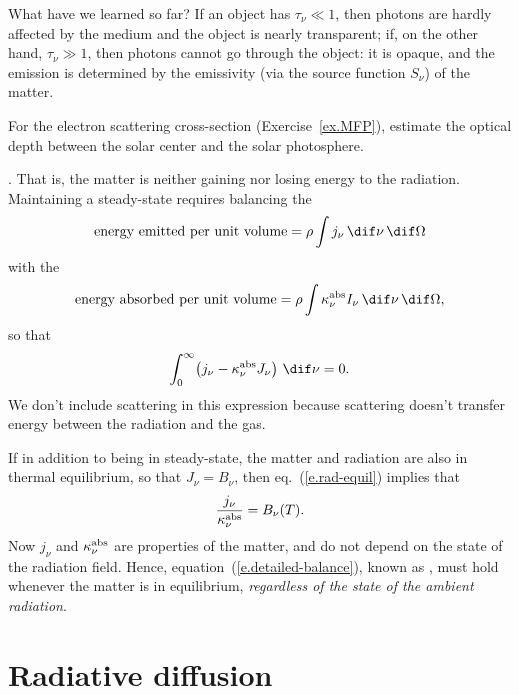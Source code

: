 What have we learned so far? If an object has $\tau_{\nu}\ll 1$, then photons are hardly affected by the medium and the object is nearly transparent; if, on the other hand, $\tau_{\nu} \gg 1$, then photons cannot go through the object: it is opaque, and the emission is determined by the emissivity (via the source function $S_{\nu}$) of the matter.

\begin{exercisebox}
For the electron scattering cross-section (Exercise~\ref{ex.MFP}), estimate the optical depth between the solar center and the solar photosphere.
\end{exercisebox}

. 
That is, the matter is neither gaining nor losing energy to the radiation. Maintaining a steady-state requires balancing the
\[ \textrm{energy emitted per unit volume} = \rho\int j_{\nu}\,\dif\nu\,\dif\Omega\] 
with the
\[ \textrm{energy absorbed per unit volume} = \rho\int \kapabs I_{\nu}\,\dif\nu\,\dif\Omega,\]
so that
\begin{equation}\label{e.rad-equil}
\int_{0}^{\infty}\! \left(j_{\nu} - \kapabs J_{\nu}\right)\,\dif\nu = 0.
\end{equation}
We don't include scattering in this expression because scattering doesn't transfer energy between the radiation and the gas.

If in addition to being in steady-state, the matter and radiation are also in thermal equilibrium, so that $J_{\nu} = B_{\nu}$, then eq.~(\ref{e.rad-equil}) implies that
\begin{equation}\label{e.detailed-balance}
\frac{j_{\nu}}{\kappa_\nu^{\mathrm{abs}}} = B_{\nu}(T).
\end{equation}
Now $j_{\nu}$ and $\kappa_\nu^{\mathrm{abs}}$ are properties of the matter, and do not depend on the state of the radiation field. Hence, equation~(\ref{e.detailed-balance}), known as , must hold whenever the matter is in equilibrium, \emph{regardless of the state of the ambient radiation}.

\section{Radiative diffusion}

